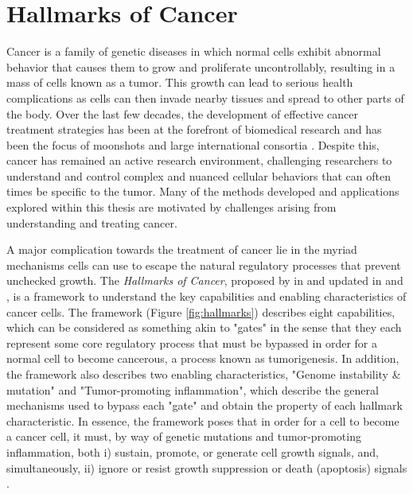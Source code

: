 \section{Hallmarks of Cancer}
Cancer is a family of genetic diseases in which normal cells exhibit abnormal behavior that causes them to grow and proliferate uncontrollably, resulting in a mass of cells known as a tumor.
This growth can lead to serious health complications as cells
can then invade nearby tissues and spread to other parts of the body.
Over the last few decades, the development of effective cancer treatment strategies has been at the forefront of biomedical research and has been the focus of moonshots \cite{thewhitehouse2016} and large international consortia \cite{icgc2020}.
Despite this, cancer has remained an active research environment, challenging researchers to understand and control complex and nuanced cellular behaviors that can often times be specific to the tumor.
Many of the methods developed and applications explored within this thesis are motivated by challenges arising from understanding and treating cancer.

A major complication towards the treatment of cancer lie in the myriad mechanisms cells can use to escape the natural regulatory processes that prevent unchecked growth.
The \emph{Hallmarks of Cancer}, proposed by \citet{hanahan2000} in \citeyear{hanahan2000} and updated in \citeyear{hanahan2011} \cite{hanahan2011} and \citeyear{hanahan2022} \citep{hanahan2022}, is a framework to understand the key capabilities and enabling characteristics of cancer cells.
The framework (Figure \ref{fig:hallmarks}) describes eight capabilities, which can be considered as something akin to "gates" in the sense that they each represent some core regulatory process that must be bypassed in order for a normal cell to become cancerous, a process known as tumorigenesis.
In addition, the framework also describes two enabling characteristics, "Genome instability \& mutation" and "Tumor-promoting inflammation", which describe the general mechanisms used to bypass each "gate" and obtain the property of each hallmark characteristic.
In essence, the framework poses that in order for a cell to become a cancer cell, it must, by way of genetic mutations and tumor-promoting inflammation, both
i) sustain, promote, or generate cell growth signals, and, simultaneously,
ii) ignore or resist growth suppression or death (apoptosis) signals \cite{hanahan2011}.

